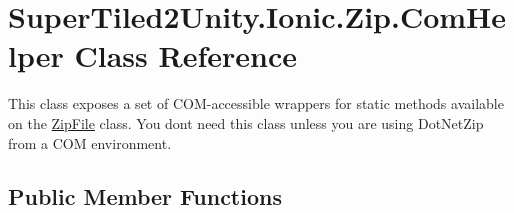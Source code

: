 \hypertarget{class_super_tiled2_unity_1_1_ionic_1_1_zip_1_1_com_helper}{}\section{Super\+Tiled2\+Unity.\+Ionic.\+Zip.\+Com\+Helper Class Reference}
\label{class_super_tiled2_unity_1_1_ionic_1_1_zip_1_1_com_helper}


This class exposes a set of C\+O\+M-\/accessible wrappers for static methods available on the \mbox{\hyperlink{class_super_tiled2_unity_1_1_ionic_1_1_zip_1_1_zip_file}{Zip\+File}} class. You don\textquotesingle{}t need this class unless you are using Dot\+Net\+Zip from a C\+OM environment.  


\subsection*{Public Member Functions}
